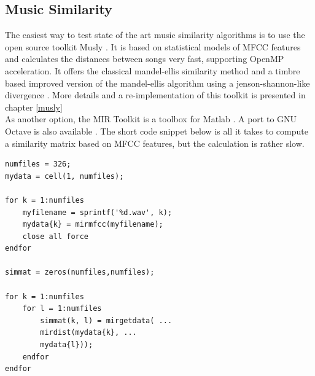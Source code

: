 \subsection{Music Similarity}

The easiest way to test state of the art music similarity algorithms is to use the open source toolkit Musly \cite{musly1}. It is based on statistical models of MFCC features and calculates the distances between songs very fast, supporting OpenMP acceleration. It offers the classical mandel-ellis similarity method \cite{mandelellis1} and a timbre based improved version of the mandel-ellis algorithm using a jenson-shannon-like divergence \cite{musly2}. More details and a re-implementation of this toolkit is presented in chapter \ref{musly}\\
As another option, the MIR Toolkit \cite{mirtoolbox1} is a toolbox for Matlab \cite{matl1}. A port to GNU Octave \cite{octave1} is also available \cite{mirtoolbox2}. The short code snippet below is all it takes to compute a similarity matrix based on MFCC features, but the calculation is rather slow.

\lstset{language=Matlab}          %
\FloatBarrier
\begin{lstlisting}[frame=single]  % Start your code-block
numfiles = 326;
mydata = cell(1, numfiles);

for k = 1:numfiles
	myfilename = sprintf('%d.wav', k);
	mydata{k} = mirmfcc(myfilename);
	close all force
endfor

simmat = zeros(numfiles,numfiles);

for k = 1:numfiles
	for l = 1:numfiles
		simmat(k, l) = mirgetdata( ...
		mirdist(mydata{k}, ...
		mydata{l}));
	endfor
endfor
\end{lstlisting}
\FloatBarrier

